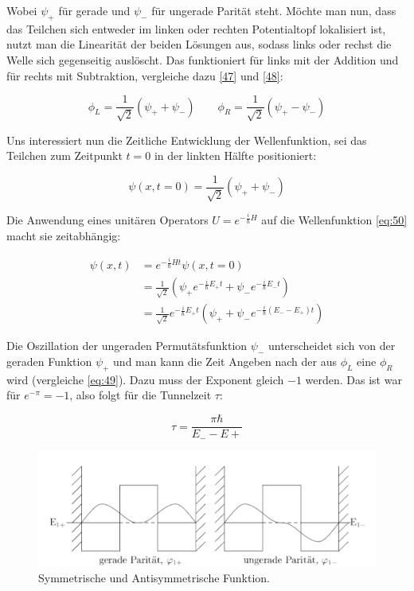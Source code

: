 Wobei \(\psi_+\) für gerade und \(\psi_-\) für ungerade Parität steht. Möchte man nun, dass das Teilchen sich entweder im linken oder rechten Potentialtopf lokalisiert ist, nutzt man die Linearität der beiden Lösungen aus, sodass links oder rechst die Welle sich gegenseitig auslöscht. Das funktioniert für links mit der Addition und für rechts mit Subtraktion, vergleiche dazu \eqref{47} und \eqref{48}:

\begin{equation}
  \label{eq:49}
  \phi_L = \frac{1}{\sqrt{2}}(\psi_+ + \psi_-) \qquad  \phi_R = \frac{1}{\sqrt{2}}(\psi_+ - \psi_-) 
\end{equation}

Uns interessiert nun die Zeitliche Entwicklung der Wellenfunktion, sei das Teilchen zum Zeitpunkt \(t=0\) in der linkten Hälfte positioniert:

\begin{equation}
  \label{eq:50}
  \psi(x,t=0) = \frac{1}{\sqrt{2}}(\psi_+ + \psi_-)
\end{equation}

Die Anwendung eines unitären Operators \(U=e^{-\frac{i}{\hbar}H}\) auf die Wellenfunktion \eqref{eq:50} macht sie zeitabhängig:

\begin{align}
  \label{eq:51}
  \psi(x,t) &= e^{-\frac{i}{\hbar}Ht}\psi(x,t=0)\\
&= \frac{1}{\sqrt{2}}\left(\psi_+e^{-\frac{i}{\hbar}E_+t} + \psi_-e^{-\frac{i}{\hbar}E_-t}\right) \\
&= \frac{1}{\sqrt{2}}e^{-\frac{i}{\hbar}E_+t}\left(\psi_+ + \psi_-e^{-\frac{i}{\hbar}(E_--E_+)t}\right) 
\end{align}

Die Oszillation der ungeraden Permutätsfunktion \(\psi_-\) unterscheidet sich von der geraden Funktion \(\psi_+\) und man kann die Zeit Angeben nach der aus \(\phi_L\) eine \(\phi_R\) wird (vergleiche \eqref{eq:49}). Dazu muss der Exponent gleich \(-1\) werden. Das ist war für \(e^{-\pi} = -1\), also folgt für die Tunnelzeit \(\tau\):

\begin{equation}
  \label{eq:52}
  \tau = \frac{\pi\hbar}{E_--E+}
\end{equation}


\begin{figure}[htbp]
  \centering
  \includegraphics{./sgl_doppelmuldenpotential_pics/pic02_v.pdf}
  \caption{Symmetrische und Antisymmetrische Funktion.}
  \label{fig:fg2}
\end{figure}


